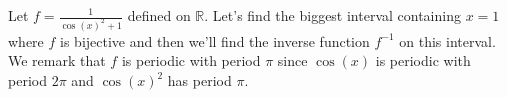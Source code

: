 \begin{eg}
    Let $f = \frac{1}{\cos(x)^2 + 1}$ defined on $\mathbb{R}$. Let's find the biggest interval containing $x= 1$ where $f$ is bijective and then we'll find the inverse function $f^{-1}$ on this interval. \\
    We remark that $f$ is periodic with period $\pi$ since $\cos(x)$ is periodic with period $2\pi$ and $\cos(x)^2$ has period $\pi$. \\
\end{eg}